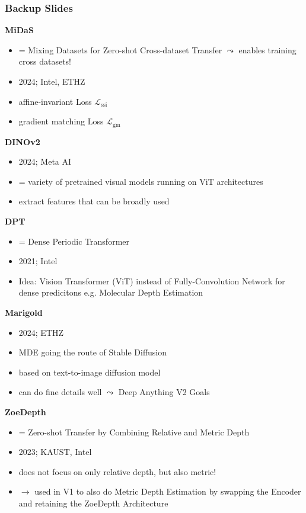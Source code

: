 \documentclass[12pt]{beamer}
\begin{document}
\begin{frame}[noframenumbering]
    \frametitle{Backup Slides}
    \scriptsize
    
    \textbf{MiDaS}
    \begin{itemize}
        \item = Mixing Datasets for Zero-shot Cross-dataset Transfer $\leadsto$ enables training cross datasets!
        \item 2024; Intel, ETHZ
        \item affine-invariant Loss $\mathcal{L}_\text{ssi}$
        \item gradient matching Loss $\mathcal{L}_\text{gm}$
    \end{itemize}

    \textbf{DINOv2}
    \begin{itemize}
        \item 2024; Meta AI
        \item = variety of pretrained visual models running on ViT architectures
        \item extract features that can be broadly used
    \end{itemize}

    \textbf{DPT}
    \begin{itemize}
        \item = Dense Periodic Transformer
        \item 2021; Intel
        \item Idea: Vision Transformer (ViT) instead of Fully-Convolution Network for dense predicitons e.g. Molecular Depth Estimation
    \end{itemize}

    
\end{frame}
\begin{frame}[noframenumbering]
    \scriptsize
    \textbf{Marigold}
    \begin{itemize}
        \item 2024; ETHZ
        \item MDE going the route of Stable Diffusion
        \item based on text-to-image diffusion model
        \item can do fine details well $\leadsto$ Deep Anything V2 Goals
    \end{itemize}
    \textbf{ZoeDepth}
    \begin{itemize}
        \item = Zero-shot Transfer by Combining Relative and Metric Depth
        \item 2023; KAUST, Intel
        \item does not focus on only relative depth, but also metric!
        \item $\rightarrow$ used in V1 to also do Metric Depth Estimation by swapping the Encoder and retaining the ZoeDepth Architecture
    \end{itemize}
\end{frame}
\end{document}
